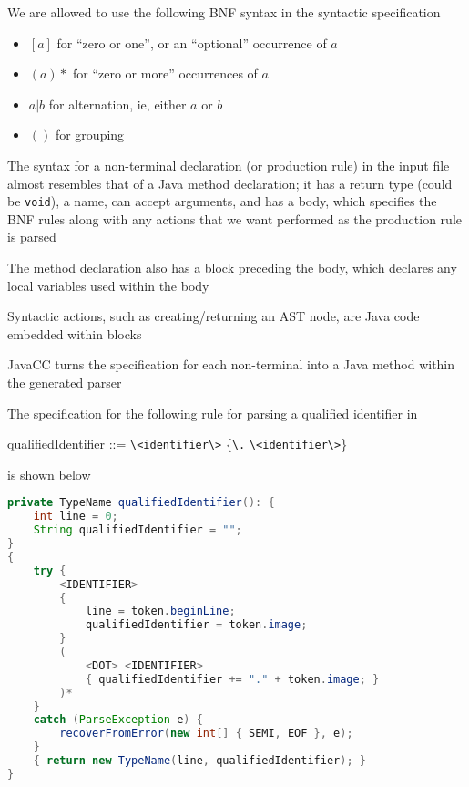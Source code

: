 \documentclass[8pt,a4paper,compress]{beamer}
\newenvironment{spaced}
{
\smallskip
\hspace{.5cm}
\begin{minipage}[c]{\textwidth}
}
{
\end{minipage}
\smallskip
}
\begin{document}
\begin{frame}[fragile]
\pause

We are allowed to use the following BNF syntax in the syntactic specification
\begin{itemize}
\item $[a]$ for ``zero or one'', or an ``optional'' occurrence of $a$
\item $(a)*$ for ``zero or more'' occurrences of $a$
\item $a | b$ for alternation, ie, either $a$ or $b$
\item $()$ for grouping
\end{itemize}

\pause
\bigskip

The syntax for a non-terminal declaration (or production rule) in the input file almost resembles that of a Java method declaration; it has a return type (could be \lstinline{void}), a name, can accept arguments, and has a body, which specifies the BNF rules along with any actions that we want performed as the production rule is parsed

\pause
\bigskip

The method declaration also has a block preceding the body, which declares any local variables used within the body

\pause
\bigskip

Syntactic actions, such as creating/returning an AST node, are Java code embedded within blocks

\pause
\bigskip

JavaCC turns the specification for each non-terminal into a Java method within the generated parser
\end{frame}

\begin{frame}[fragile]
\pause

The specification for the following rule for parsing a qualified identifier in \jmm

\text{ }
\begin{spaced}
\begin{production}
qualifiedIdentifier ::= \lstinline{\<identifier\>} \{\lstinline{\.} \lstinline{\<identifier\>}\}
\end{production}
\end{spaced}

\noindent is shown below

\begin{lstlisting}[language=Java]
private TypeName qualifiedIdentifier(): {
    int line = 0;
    String qualifiedIdentifier = "";
}
{
    try {
        <IDENTIFIER>
        {
            line = token.beginLine;
            qualifiedIdentifier = token.image;
        }
        (
            <DOT> <IDENTIFIER>
            { qualifiedIdentifier += "." + token.image; }
        )*
    }
    catch (ParseException e) {
        recoverFromError(new int[] { SEMI, EOF }, e);
    }
    { return new TypeName(line, qualifiedIdentifier); }
}
\end{lstlisting}
\end{frame}
\end{document}
